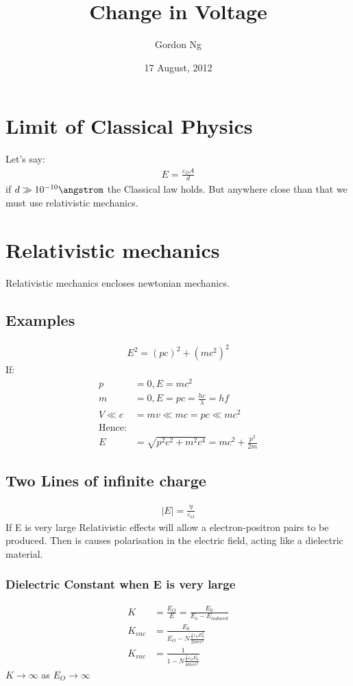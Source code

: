 \documentclass[12pt]{article}
\begin{document}
\title{Change in Voltage}
\date{17 August, 2012}
\author{Gordon Ng}
\maketitle
\pagebreak
\tableofcontents
\pagebreak
\section{Limit of Classical Physics}
Let's say:
\begin{align}
E= \frac{\varepsilon_O A}{d}
\end{align}
if $d \gg 10^{-10} \angstrom$ the Classical law holds. But anywhere close than that we must use relativistic mechanics. 

\section{Relativistic mechanics} 
Relativistic mechanics encloses newtonian mechanics.
\subsection{Examples}
\begin{align}
E^2=(pc)^2+(mc^2)^2
\end{align}
If:
\begin{align}
p &= 0, E=mc^2 \\
m &= 0, E=pc=\frac{hc}{\lambda}=hf \\
V \ll c &= mv \ll mc = pc \ll mc^2 \\
\text{Hence:} \\
E&=\sqrt{p^2c^2+m^2c^4}=mc^2+\frac{p^2}{2m}
\end{align}
\subsection{Two Lines of infinite charge}
\begin{align}
|E|=\frac{\eta}{\varepsilon_O}
\end{align}
If E is very large Relativistic effects will allow a electron-positron pairs to be produced. Then is causes polarisation in the electric field, acting like a dielectric material.

\subsubsection{Dielectric Constant when E is very large}
\begin{align}
K&=\frac{E_O}{E}=\frac{E_0}{E_o-E_{induced}} \\
K_{vac}&=\frac{E_0}{E_O-N\frac{\frac{1}{2}\varepsilon_OE_0^2}{2mec^2}} \\
K_{vac}&=\frac{1}{1-N\frac{\frac{1}{2}\varepsilon_OE_0}{4mec^2}}
\end{align}
$K \to \infty$  as $E_O \to \infty$
\end{document}
